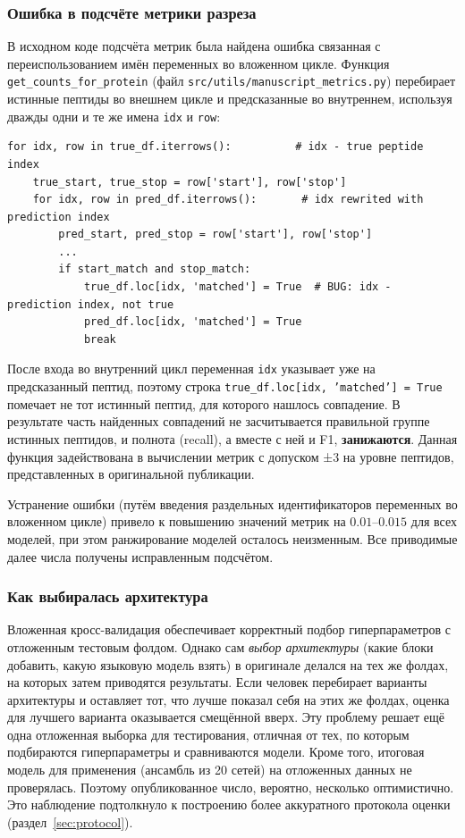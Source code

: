 \documentclass{article}
\begin{document}
\subsubsection{Ошибка в подсчёте метрики разреза}
В исходном коде подсчёта метрик была найдена ошибка связанная с переиспользованием имён переменных во вложенном цикле. Функция \texttt{get\_counts\_for\_protein} (файл \texttt{src/utils/manuscript\_metrics.py}) перебирает истинные пептиды во внешнем цикле и предсказанные во внутреннем, используя дважды одни и те же имена \texttt{idx} и \texttt{row}:

\begin{lstlisting}
for idx, row in true_df.iterrows():          # idx - true peptide index
    true_start, true_stop = row['start'], row['stop']
    for idx, row in pred_df.iterrows():       # idx rewrited with prediction index
        pred_start, pred_stop = row['start'], row['stop']
        ...
        if start_match and stop_match:
            true_df.loc[idx, 'matched'] = True  # BUG: idx - prediction index, not true
            pred_df.loc[idx, 'matched'] = True
            break
\end{lstlisting}

После входа во внутренний цикл переменная \texttt{idx} указывает уже на предсказанный пептид, поэтому строка \texttt{true\_df.loc[idx,\,'matched'] = True} помечает не тот истинный пептид, для которого нашлось совпадение. В результате часть найденных совпадений не засчитывается правильной группе истинных пептидов, и полнота (recall), а вместе с ней и F1, \textbf{занижаются}. Данная функция задействована в вычислении метрик с допуском ±3 на уровне пептидов, представленных в оригинальной публикации.

Устранение ошибки (путём введения раздельных идентификаторов переменных во вложенном цикле) привело к повышению значений метрик на $0.01$--$0.015$ для всех моделей, при этом ранжирование моделей осталось неизменным. Все приводимые далее числа получены исправленным подсчётом.

\subsubsection{Как выбиралась архитектура}
Вложенная кросс-валидация обеспечивает корректный подбор гиперпараметров с отложенным тестовым фолдом. Однако сам \emph{выбор архитектуры} (какие блоки добавить, какую языковую модель взять) в оригинале делался на тех же фолдах, на которых затем приводятся результаты. Если человек перебирает варианты архитектуры и оставляет тот, что лучше показал себя на этих же фолдах, оценка для лучшего варианта оказывается смещённой вверх. Эту проблему решает ещё одна отложенная выборка для тестирования, отличная от тех, по которым подбираются гиперпараметры и сравниваются модели. Кроме того, итоговая модель для применения (ансамбль из 20 сетей) на отложенных данных не проверялась. Поэтому опубликованное число, вероятно, несколько оптимистично. Это наблюдение подтолкнуло к построению более аккуратного протокола оценки (раздел~\ref{sec:protocol}).
\end{document}
